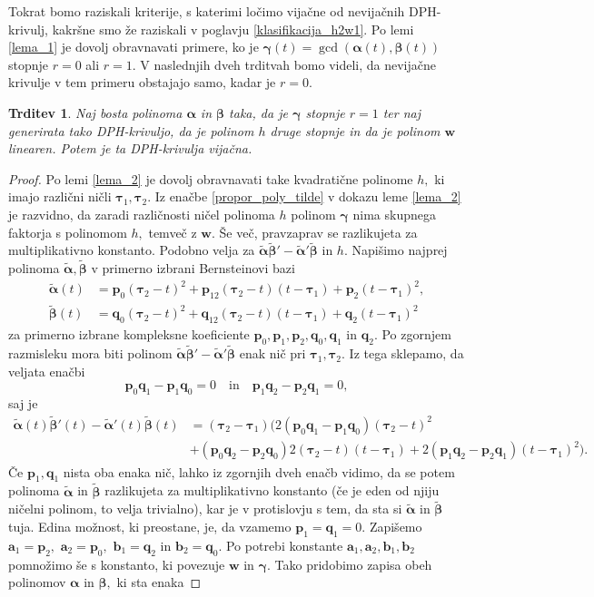 \documentclass[12pt,a4paper,twoside]{article}
\theoremstyle{definition} %
\theoremstyle{plain} %
\newtheorem{trditev}[definicija]{Trditev}
\theoremstyle{primerstyle}
\numberwithin{equation}{section}  %
\newcommand{\aV}{\mathbf{a}}
\newcommand{\bV}{\mathbf{b}}
\newcommand{\pV}{\mathbf{p}}
\newcommand{\qV}{\mathbf{q}}
\newcommand{\wV}{\mathbf{w}}
\newcommand{\balpha}{\boldsymbol \alpha}
\newcommand{\bbeta}{\boldsymbol \beta}
\newcommand{\bgamma}{\boldsymbol \gamma}
\newcommand{\btau}{\boldsymbol \tau}
\newcommand{\btalpha}{\tilde{\boldsymbol \alpha}}
\newcommand{\btbeta}{\tilde{\boldsymbol \beta}}
\begin{document}
Tokrat bomo raziskali kriterije, s katerimi ločimo vijačne od nevijačnih DPH-krivulj, kakršne smo že raziskali v poglavju \ref{klasifikacija_h2w1}. Po lemi \ref{lema_1} je dovolj obravnavati primere, ko je $\bgamma(t)=\gcd(\balpha(t),\bbeta(t))$ stopnje $r=0$ ali $r=1.$ V naslednjih dveh trditvah bomo videli, da nevijačne krivulje v tem primeru obstajajo samo, kadar je $r=0.$
\begin{trditev}
	\label{locevanje_h2w1_trditev1}
	Naj bosta polinoma $\balpha$ in $\bbeta$ taka, da je $\bgamma$ stopnje $r=1$ ter naj generirata tako DPH-krivuljo, da je polinom $h$ druge stopnje in da je polinom $\wV$ linearen. Potem je ta DPH-krivulja vijačna.
\end{trditev}
\begin{proof}
	Po lemi \ref{lema_2} je dovolj obravnavati take kvadratične polinome $h,$ ki imajo različni ničli $\btau_1,\btau_2.$ Iz enačbe \eqref{propor_poly_tilde} v dokazu leme \ref{lema_2} je razvidno, da zaradi različnosti ničel polinoma $h$ polinom $\bgamma$ nima skupnega faktorja s polinomom $h,$ temveč z $\wV.$ Še več, pravzaprav se razlikujeta za multiplikativno konstanto. Podobno velja za $\btalpha\btbeta'-\btalpha'\btbeta$ in $h.$ Napišimo najprej polinoma $\btalpha,\btbeta$ v primerno izbrani Bernsteinovi bazi
	\begin{align*}
		\btalpha(t)&=\pV_0(\btau_2-t)^2+\pV_12(\btau_2-t)(t-\btau_1)+\pV_2(t-\btau_1)^2,\\
		\btbeta(t)&=\qV_0(\btau_2-t)^2+\qV_12(\btau_2-t)(t-\btau_1)+\qV_2(t-\btau_1)^2
	\end{align*}
	za primerno izbrane kompleksne koeficiente $\pV_0,\pV_1,\pV_2,\qV_0,\qV_1$ in $\qV_2.$ Po zgornjem razmisleku mora biti polinom $\btalpha\btbeta'-\btalpha'\btbeta$ enak nič pri $\btau_1,\btau_2.$ Iz tega sklepamo, da veljata enačbi
	\begin{equation*}
		\pV_0\qV_1-\pV_1\qV_0=0\quad\text{in}\quad\pV_1\qV_2-\pV_2\qV_1=0,
	\end{equation*}
	saj je
	\begin{align*}
		\btalpha(t)\btbeta'(t)-\btalpha'(t)\btbeta(t)&=(\btau_2-\btau_1)\big(2(\pV_0\qV_1-\pV_1\qV_0)(\btau_2-t)^2\\
		&+(\pV_0\qV_2-\pV_2\qV_0)2(\btau_2-t)(t-\btau_1)
		+2(\pV_1\qV_2-\pV_2\qV_1)(t-\btau_1)^2\big).
	\end{align*}
	Če $\pV_1,\qV_1$ nista oba enaka nič, lahko iz zgornjih dveh enačb vidimo, da se potem polinoma $\btalpha$ in $\btbeta$ razlikujeta za multiplikativno konstanto (če je eden od njiju ničelni polinom, to velja trivialno), kar je v protislovju s tem, da sta si $\btalpha$ in $\btbeta$ tuja. Edina možnost, ki preostane, je, da vzamemo $\pV_1=\qV_1=0.$ Zapišemo $\aV_1=\pV_2,$ $\aV_2=\pV_0,$ $\bV_1=\qV_2$ in $\bV_2=\qV_0.$ Po potrebi konstante $\aV_1,\aV_2,\bV_1,\bV_2$ pomnožimo še s konstanto, ki povezuje $\wV$ in $\bgamma$. Tako pridobimo zapisa obeh polinomov $\balpha$ in $\bbeta,$ ki sta enaka

\end{proof}
\end{document}
